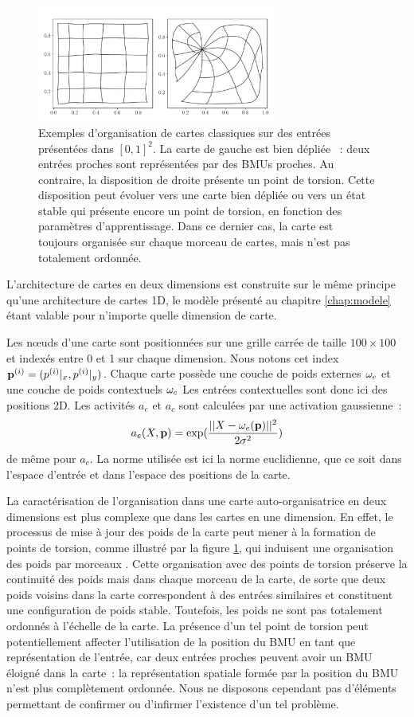 \documentclass[../main]{subfiles}
\begin{document}
\begin{figure}
	\centering\includegraphics[width=0.7\textwidth]{grid_torsion.pdf}
	\caption{Exemples d'organisation de cartes classiques sur des entrées présentées dans $[0,1]^2$. 
	La carte de gauche est \og bien dépliée \fg{}~: deux entrées proches sont représentées par des BMUs proches. 
	Au contraire, la disposition de droite présente un point de torsion. Cette disposition peut évoluer vers une carte bien dépliée ou vers un état stable qui présente encore un point de torsion, en fonction des paramètres d'apprentissage. Dans ce dernier cas, la carte est toujours organisée sur chaque morceau de cartes, mais n'est pas totalement ordonnée. \label{fig:torsion}
	}
\end{figure}

L'architecture de cartes en deux dimensions est construite sur le même principe qu'une architecture de cartes 1D, le modèle présenté au chapitre \ref{chap:modele} étant valable pour n'importe quelle dimension de carte.

Les n\oe{}uds d'une carte sont positionnées sur une grille carrée de taille $100 \times 100$ et indexés entre 0 et 1 sur chaque dimension. Nous notons cet index $\mathbf{p}^{({i})} = (p^{({i})}|_x, p^{({i})}|_y)$.
Chaque carte possède une couche de poids externes $\omega_{e}$ et une couche de poids contextuels $\omega_c$
Les entrées contextuelles sont donc ici des positions 2D.
Les activités $a_e$ et $a_c$ sont calculées par une activation gaussienne~:
$$a_e(X,\mathbf{p}) = \exp(\frac{||X - \omega_e(\mathbf{p}) ||^2}{2\sigma^2})$$
de même pour $a_c$.
La norme utilisée est ici la norme euclidienne, que ce soit dans l'espace d'entrée et dans l'espace des positions de la carte. 

La caractérisation de l'organisation dans une carte auto-organisatrice en deux dimensions est plus complexe que dans les cartes en une dimension. En effet, le processus de mise à jour des poids de la carte peut mener à la formation de points de torsion, comme illustré par la figure \ref{fig:torsion}, qui induisent une organisation des poids \og par morceaux \fg{}. Cette organisation avec des points de torsion préserve la continuité des poids mais dans chaque morceau de la carte, de sorte que deux poids voisins dans la carte correspondent à des entrées similaires et constituent une configuration de poids stable. Toutefois, les poids ne sont pas totalement ordonnés à l'échelle de la carte. La présence d'un tel point de torsion peut potentiellement affecter l'utilisation de la position du BMU en tant que représentation de l'entrée, car deux entrées proches peuvent avoir un BMU éloigné dans la carte~: la représentation spatiale formée par la position du BMU n'est plus complètement ordonnée. Nous ne disposons cependant pas d'éléments permettant de confirmer ou d'infirmer l'existence d'un tel problème.
\end{document}
